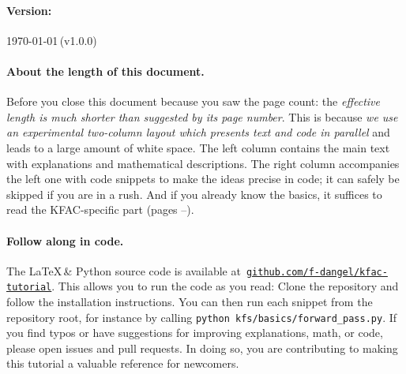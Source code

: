 \vfill

\paragraph{Version:} \today\,(v1.0.0)

\paragraph{About the length of this document.}
Before you close this document because you saw the page count:
the \emph{effective length is much shorter than suggested by its page number}.
This is because \emph{we use an experimental two-column layout which presents text and code in parallel} and leads to a large amount of white space.
The left column contains the main text with explanations and mathematical descriptions.
The right column accompanies the left one with code snippets to make the ideas precise in code; it can safely be skipped if you are in a rush.
And if you already know the basics, it suffices to read the KFAC-specific part (pages \pageref{sec:kfac-overview}--\pageref{sec:kfac-cheatsheet}).

\paragraph{Follow along in code.} The \LaTeX\,\& Python source code is available at~\href{\repourl}{\texttt{github.com/f-dangel/kfac-tutorial}}.
This allows you to run the code as you read:
Clone the repository and follow the installation instructions.
You can then run each snippet from the repository root, for instance by calling \texttt{python kfs/basics/forward\_pass.py}.
If you find typos or have suggestions for improving explanations, math, or code, please open issues and pull requests.
In doing so, you are contributing to making this tutorial a valuable reference for newcomers.

\vspace{\baselineskip}
